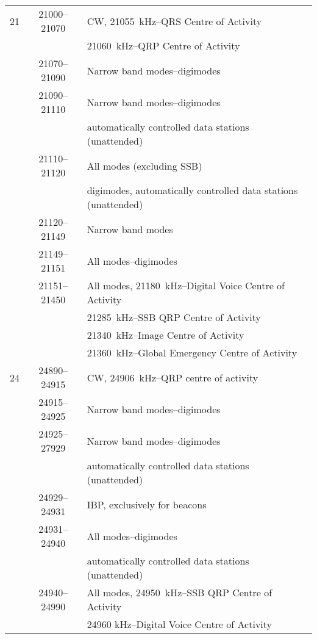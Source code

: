 \begin{longtable}{lcl}
21   & 21000--21070 & CW, 21055~kHz--QRS Centre of Activity\\
 & & 21060~kHz--QRP Centre of Activity\\
 & 21070--21090 & Narrow band modes--digimodes\\
     & 21090--21110 & Narrow band modes--digimodes\\
     & & automatically controlled data stations (unattended)\\
     & 21110--21120 & All modes (excluding SSB)\\
     & & digimodes, automatically controlled data stations (unattended)\\
     & 21120--21149 & Narrow band modes\\
     & 21149--21151 & All modes--digimodes\\
     & 21151--21450 & All modes, 21180~kHz--Digital Voice Centre of Activity \\
     & & 21285~kHz--SSB QRP Centre of Activity\\
     & & 21340~kHz--Image Centre of Activity\\
     & & 21360~kHz--Global Emergency Centre of Activity\\

24   & 24890--24915 & CW, 24906~kHz--QRP centre of activity\\
     & 24915--24925 & Narrow band modes--digimodes\\
     & 24925--27929 & Narrow band modes--digimodes\\
     & & automatically controlled data stations (unattended)\\
     & 24929--24931 & IBP, exclusively for beacons\\
     & 24931--24940 & All modes--digimodes\\
     & & automatically controlled data stations (unattended)\\
     & 24940--24990 & All modes, 24950~kHz--SSB QRP Centre of Activity\\
     & & 24960 kHz--Digital Voice Centre of Activity\\


\end{longtable}
